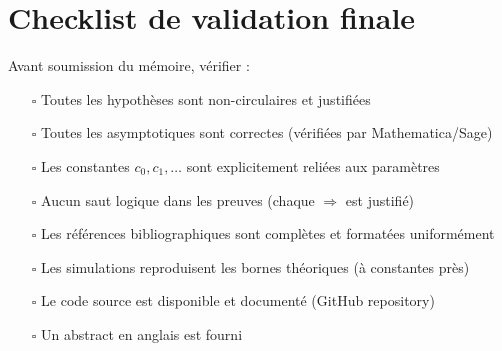 \documentclass[12pt,a4paper]{article}
\theoremstyle{definition}
\theoremstyle{remark}
\begin{document}
\section{Checklist de validation finale}

Avant soumission du mémoire, vérifier :

\begin{itemize}
\item[$\square$] Toutes les hypothèses sont non-circulaires et justifiées
\item[$\square$] Toutes les asymptotiques sont correctes (vérifiées par Mathematica/Sage)
\item[$\square$] Les constantes $c_0, c_1, \ldots$ sont explicitement reliées aux paramètres
\item[$\square$] Aucun saut logique dans les preuves (chaque $\Rightarrow$ est justifié)
\item[$\square$] Les références bibliographiques sont complètes et formatées uniformément
\item[$\square$] Les simulations reproduisent les bornes théoriques (à constantes près)
\item[$\square$] Le code source est disponible et documenté (GitHub repository)
\item[$\square$] Un abstract en anglais est fourni
\end{itemize}
\end{document}
